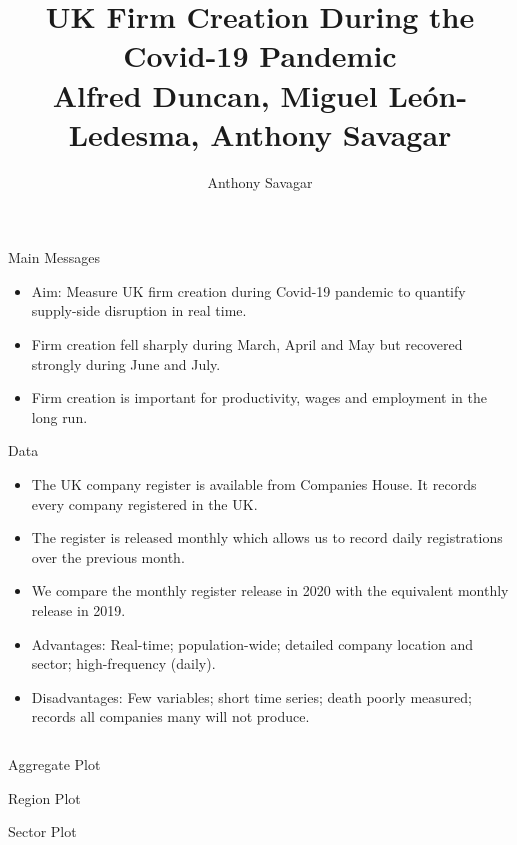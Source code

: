 \documentclass{beamer}
\author[a.savagar@kent.ac.uk]{Anthony Savagar}
\title{UK Firm Creation During the Covid-19 Pandemic \\ \small Alfred Duncan, Miguel León-Ledesma, Anthony Savagar}
\institute{University of Kent}
\begin{document}
  \begin{frame}{} 
    \begin{block}{\large Main Messages}
        \begin{itemize}
            \item \alert{Aim:} Measure UK firm creation during Covid-19 pandemic to quantify supply-side disruption in real time. 
            \item Firm creation fell sharply during March, April and May but recovered strongly during June and July.
            \item Firm creation is important for productivity, wages and employment in the long run.
        \end{itemize}
    \end{block}
    \begin{block}{\large Data}
        \begin{itemize}
        \item The UK company register is available from Companies House. It records every company registered in the UK.
        \item The register is released monthly which allows us to record daily registrations over the previous month. 
        \item We compare the monthly register release in 2020 with the equivalent monthly release in 2019.
            \item \alert{Advantages:} Real-time; population-wide; detailed company location and sector; high-frequency (daily).
            \item \alert{Disadvantages:} Few variables; short time series; death poorly measured; records all companies many will not produce.
        \end{itemize}
    \end{block}
    \begin{columns}[t]
      \begin{column}{.49\linewidth}
        \begin{block}{Aggregate Plot}
        
        \end{block}

        \begin{block}{Region Plot}
        
        \end{block}
        
        \begin{block}{Sector Plot}
        
      \end{block}
      \end{column}
      

\end{columns}
\end{frame}
\end{document}
